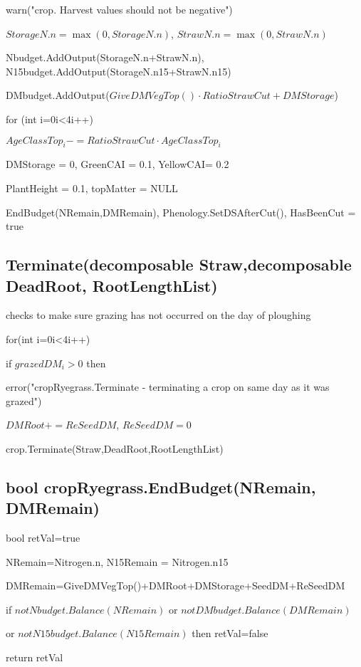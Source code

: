 \documentclass[%
]{scrartcl}
\begin{document}
\quad	   warn("crop. Harvest values should not be negative")

 \quad     $StorageN.n = \max(0,StorageN.n)$,
    $StrawN.n = \max(0,StrawN.n)$


   Nbudget.AddOutput(StorageN.n+StrawN.n),
   N15budget.AddOutput(StorageN.n15+StrawN.n15)                   

   DMbudget.AddOutput($GiveDMVegTop() \cdot RatioStrawCut+DMStorage$)

   for (int i=0i<4i++)

   \quad 	$AgeClassTop_i -= RatioStrawCut \cdot AgeClassTop_i$

DMStorage   = 0, 
GreenCAI = 0.1,
YellowCAI= 0.2

   PlantHeight        = 0.1,
   topMatter          = NULL


   EndBudget(NRemain,DMRemain),   Phenology.SetDSAfterCut(),    HasBeenCut = true


\subsection{Terminate(decomposable Straw,decomposable DeadRoot, RootLengthList)}
checks to make sure grazing has not occurred on the day of ploughing

   for(int i=0i<4i++)

    \quad   if $grazedDM_i>0$ then

     \quad      \quad error("cropRyegrass.Terminate - terminating a crop on same day as it was grazed")
   
   $DMRoot += ReSeedDM$, $ReSeedDM = 0$

   crop.Terminate(Straw,DeadRoot,RootLengthList)

\subsection{bool cropRyegrass.EndBudget(NRemain, DMRemain)}

	bool retVal=true

  NRemain=Nitrogen.n, N15Remain = Nitrogen.n15

  DMRemain=GiveDMVegTop()+DMRoot+DMStorage+SeedDM+ReSeedDM

    

   if $ not Nbudget.Balance(NRemain)$ or $ not DMbudget.Balance(DMRemain) $

  \quad or $ not N15budget.Balance(N15Remain)$ then retVal=false
 

   return retVal



  
\end{document}
